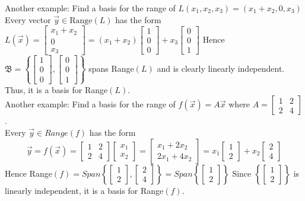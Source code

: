 \documentclass[10pt,letter]{article}
\begin{document}
Another example: Find a basis for the range of $L(x_1,x_2,x_3)=(x_1+x_2,0,x_3)$ \\ 
Every vector $\vec{y}\in\text{Range}(L)$ has the form $L(\vec{x})=\begin{bmatrix}x_1+x_2\\0\\x_3\end{bmatrix}=(x_1+x_2)\begin{bmatrix}1\\0\\0\end{bmatrix}+x_3\begin{bmatrix}0\\0\\1\end{bmatrix}$ Hence $\mathfrak{B}=\left\{\begin{bmatrix}1\\0\\0\end{bmatrix},\begin{bmatrix}0\\0\\1\end{bmatrix}\right\}$ spans Range$(L)$ and is clearly linearly independent. Thus, it is a basis for Range$(L)$. \\ 
Another example: Find a basis for the range of $f(\vec{x})=A\vec{x}$ where $A=\begin{bmatrix}1&2\\2&4\end{bmatrix}$.\\ 
Every $\vec{y}\in Range(f)$ has the form $$\vec{y}=f(\vec{x})=\begin{bmatrix}1&2\\2&4\end{bmatrix}\begin{bmatrix}x_1\\x_2\end{bmatrix}=\begin{bmatrix}x_1+2x_2\\2x_1+4x_2\end{bmatrix}=x_1\begin{bmatrix}1\\2\end{bmatrix}+x_2\begin{bmatrix}2\\4\end{bmatrix}$$ Hence Range$(f)=Span\left\{\begin{bmatrix}1\\2\end{bmatrix},\begin{bmatrix}2\\4\end{bmatrix}\right\}=Span\left\{\begin{bmatrix}1\\2\end{bmatrix}\right\}$ Since $\left\{\begin{bmatrix}1\\2\end{bmatrix}\right\}$ is linearly independent, it is a basis for Range$(f)$. \\ 
\end{document}
